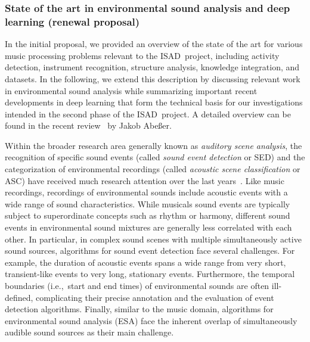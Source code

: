 \documentclass[11pt,a4paper]{article}
\def\PN{\mathrm{ISAD}}
\newcommand{\iec}{i.e.,\ }
\theoremstyle{plain} \newtheorem{define}{Definition}[section]
\begin{document}
{%
\subsubsection*{State of the art in environmental sound analysis and deep learning (renewal proposal)}

In the initial proposal, we provided an overview of the state of the art for various music processing problems relevant to the $\PN$~project, including activity detection, instrument recognition, structure analysis, knowledge integration, and datasets. In the following, we extend this description by discussing relevant work in environmental sound analysis while summarizing important recent developments in deep learning that form the technical basis for our investigations intended in the second phase of the $\PN$~project. A detailed overview can be found in the recent review~\cite{Abesser20_AcousticSceneClassification_AppliedSciences} by Jakob Abe{\ss}er.

Within the broader research area generally known as \emph{auditory scene analysis}, the recognition of specific sound events (called \emph {sound event detection} or SED) and the categorization of environmental recordings (called \emph{acoustic scene classification} or ASC) have received much research attention over the last years~\cite{VirtanenPE08_CompAnalSoundScene_Springer}. 
%
Like music recordings, recordings of environmental sounds include acoustic events with a wide range of sound characteristics. While musicals sound events are typically subject to superordinate concepts such as rhythm or harmony, different sound events in environmental sound mixtures are generally less correlated with each other.  In particular, in complex sound scenes with multiple simultaneously active sound sources, algorithms for sound event detection face several challenges. For example, the duration of acoustic events spans a wide range from very short, transient-like events to very long, stationary events. Furthermore, the temporal boundaries (\iec start and end times) of environmental sounds are often ill-defined, complicating their precise annotation and the evaluation of event detection algorithms. 
%
Finally, similar to the music domain, algorithms for environmental sound analysis (ESA) face the inherent overlap of simultaneously audible sound sources as their main challenge.

}
\end{document}
